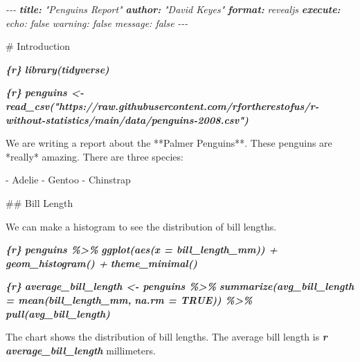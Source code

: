 \documentclass[
]{book}
\newenvironment{Shaded}{\begin{snugshade}}{\end{snugshade}}
\newcommand{\AnnotationTok}[1]{\textcolor[rgb]{0.56,0.35,0.01}{\textbf{\textit{#1}}}}
\newcommand{\CommentTok}[1]{\textcolor[rgb]{0.56,0.35,0.01}{\textit{#1}}}
\newcommand{\FunctionTok}[1]{\textcolor[rgb]{0.00,0.00,0.00}{#1}}
\newcommand{\InformationTok}[1]{\textcolor[rgb]{0.56,0.35,0.01}{\textbf{\textit{#1}}}}
\newcommand{\NormalTok}[1]{#1}
\newcommand{\SpecialStringTok}[1]{\textcolor[rgb]{0.31,0.60,0.02}{#1}}
\begin{document}
\begin{Shaded}
\begin{Highlighting}[]
\CommentTok{{-}{-}{-}}
\AnnotationTok{title:}\CommentTok{ "Penguins Report"}
\AnnotationTok{author:}\CommentTok{ "David Keyes"}
\AnnotationTok{format:}\CommentTok{ revealjs}
\AnnotationTok{execute:}\CommentTok{ }
\CommentTok{  echo: false}
\CommentTok{  warning: false}
\CommentTok{  message: false}
\CommentTok{{-}{-}{-}}

\FunctionTok{\# Introduction}

\InformationTok{\textasciigrave{}\textasciigrave{}\textasciigrave{}\{r\}}
\InformationTok{library(tidyverse)}
\InformationTok{\textasciigrave{}\textasciigrave{}\textasciigrave{}}

\InformationTok{\textasciigrave{}\textasciigrave{}\textasciigrave{}\{r\}}
\InformationTok{penguins \textless{}{-} read\_csv("https://raw.githubusercontent.com/rfortherestofus/r{-}without{-}statistics/main/data/penguins{-}2008.csv")}
\InformationTok{\textasciigrave{}\textasciigrave{}\textasciigrave{}}

\NormalTok{We are writing a report about the **Palmer Penguins**. These penguins are *really* amazing. There are three species:}

\SpecialStringTok{{-} }\NormalTok{Adelie}
\SpecialStringTok{{-} }\NormalTok{Gentoo}
\SpecialStringTok{{-} }\NormalTok{Chinstrap}

\FunctionTok{\#\# Bill Length}

\NormalTok{We can make a histogram to see the distribution of bill lengths.}

\InformationTok{\textasciigrave{}\textasciigrave{}\textasciigrave{}\{r\}}
\InformationTok{penguins \%\textgreater{}\% }
\InformationTok{  ggplot(aes(x = bill\_length\_mm)) +}
\InformationTok{  geom\_histogram() +}
\InformationTok{  theme\_minimal()}
\InformationTok{\textasciigrave{}\textasciigrave{}\textasciigrave{}}

\InformationTok{\textasciigrave{}\textasciigrave{}\textasciigrave{}\{r\}}
\InformationTok{average\_bill\_length \textless{}{-} penguins \%\textgreater{}\% }
\InformationTok{  summarize(avg\_bill\_length = mean(bill\_length\_mm,}
\InformationTok{                                   na.rm = TRUE)) \%\textgreater{}\% }
\InformationTok{  pull(avg\_bill\_length)}
\InformationTok{\textasciigrave{}\textasciigrave{}\textasciigrave{}}

\NormalTok{The chart shows the distribution of bill lengths. The average bill length is }\InformationTok{\textasciigrave{}r average\_bill\_length\textasciigrave{}}\NormalTok{ millimeters.}
\end{Highlighting}
\end{Shaded}
\end{document}
